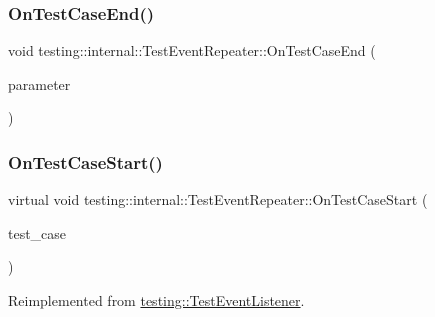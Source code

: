\mbox{\label{classtesting_1_1internal_1_1_test_event_repeater_a78ea68cab4207e0fd458ced444f42ef5}} 
\subsubsection{\texorpdfstring{OnTestCaseEnd()}{OnTestCaseEnd()}\hspace{0.1cm}{\footnotesize\ttfamily [3/3]}}
{\footnotesize\ttfamily void testing\+::internal\+::\+Test\+Event\+Repeater\+::\+On\+Test\+Case\+End (\begin{DoxyParamCaption}\item[{const \mbox{\hyperlink{classtesting_1_1_test_suite}{Test\+Suite}} \&}]{parameter }\end{DoxyParamCaption})\hspace{0.3cm}{\ttfamily [override]}}

\mbox{\label{classtesting_1_1internal_1_1_test_event_repeater_a70124c738caa338bcd723eb2a51c8b3e}} 
\subsubsection{\texorpdfstring{OnTestCaseStart()}{OnTestCaseStart()}\hspace{0.1cm}{\footnotesize\ttfamily [1/3]}}
{\footnotesize\ttfamily virtual void testing\+::internal\+::\+Test\+Event\+Repeater\+::\+On\+Test\+Case\+Start (\begin{DoxyParamCaption}\item[{const \mbox{\hyperlink{classtesting_1_1_test_case}{Test\+Case}} \&}]{test\+\_\+case }\end{DoxyParamCaption})\hspace{0.3cm}{\ttfamily [virtual]}}



Reimplemented from \mbox{\hyperlink{classtesting_1_1_test_event_listener_ac48628c9f78d3e10bff77c7366e9e780}{testing\+::\+Test\+Event\+Listener}}.


